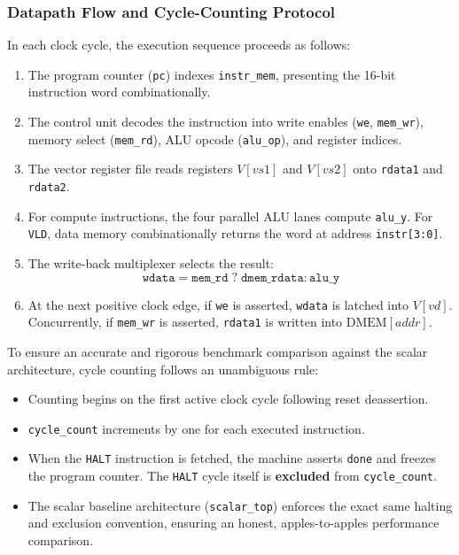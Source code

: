 \subsubsection{Datapath Flow and Cycle-Counting Protocol}
In each clock cycle, the execution sequence proceeds as follows:
\begin{enumerate}
  \item The program counter (\texttt{pc}) indexes \texttt{instr\_mem}, presenting the 16-bit instruction word combinationally.
  \item The control unit decodes the instruction into write enables (\texttt{we}, \texttt{mem\_wr}), memory select (\texttt{mem\_rd}), ALU opcode (\texttt{alu\_op}), and register indices.
  \item The vector register file reads registers $V[vs1]$ and $V[vs2]$ onto \texttt{rdata1} and \texttt{rdata2}.
  \item For compute instructions, the four parallel ALU lanes compute \texttt{alu\_y}. For \texttt{VLD}, data memory combinationally returns the word at address \texttt{instr[3:0]}.
  \item The write-back multiplexer selects the result:
  \begin{equation}
    \texttt{wdata} = \texttt{mem\_rd} \;?\; \texttt{dmem\_rdata} : \texttt{alu\_y}
  \end{equation}
  \item At the next positive clock edge, if \texttt{we} is asserted, \texttt{wdata} is latched into $V[vd]$. Concurrently, if \texttt{mem\_wr} is asserted, \texttt{rdata1} is written into $\text{DMEM}[addr]$.
\end{enumerate}

To ensure an accurate and rigorous benchmark comparison against the scalar architecture, cycle counting follows an unambiguous rule:
\begin{itemize}
  \item Counting begins on the first active clock cycle following reset deassertion.
  \item \texttt{cycle\_count} increments by one for each executed instruction.
  \item When the \texttt{HALT} instruction is fetched, the machine asserts \texttt{done} and freezes the program counter. The \texttt{HALT} cycle itself is \textbf{excluded} from \texttt{cycle\_count}.
  \item The scalar baseline architecture (\texttt{scalar\_top}) enforces the exact same halting and exclusion convention, ensuring an honest, apples-to-apples performance comparison.
\end{itemize}
